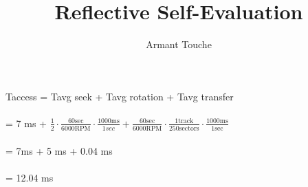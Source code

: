 \documentclass{article}
\begin{document}
\title{\vspace{-2cm}Reflective Self-Evaluation}
\author{Armant Touche}

    Taccess = Tavg seek + Tavg rotation + Tavg transfer\\\\
    = 7 ms + $\frac{1}{2}\cdot\frac{60\text{sec}}{6000\text{RPM}}\cdot\frac{1000\text{ms}}{1{sec}} + \frac{60\text{sec}}{6000\text{RPM}}\cdot\frac{1\text{track}}{250\text{sectors}}\cdot\frac{1000\text{ms}}{1\text{sec}}$\\\\
    = 7ms + 5 ms + 0.04 ms\\\\
    = 12.04 ms
\end{document}
